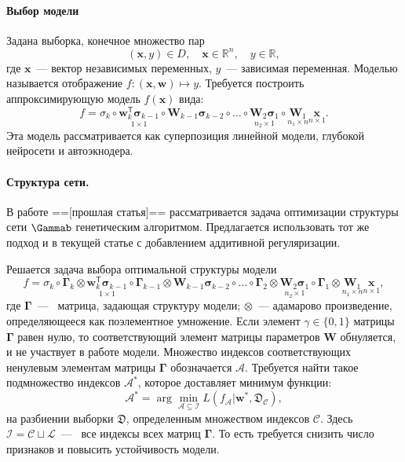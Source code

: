 \documentclass[12pt, twoside]{article}
\newcommand{\xb}{{\mathbf{x}}}
\newcommand{\sigmab}{{\boldsymbol{\sigma}}}
\newcommand{\x}{{\mathbf{x}}}
\newcommand{\w}{{\mathbf{W}}}
\newcommand{\wm}{{\mathbf{w}}}
\begin{document}
\paragraph{Выбор модели}
Задана выборка, конечное множество пар
\begin{equation}\label{eq3}
(\xb,y) \in D,\quad \xb \in \mathbb{R}^{n},\quad y\in \mathbb{R},
\end{equation}
где $\xb$~--- вектор независимых переменных, $y$~--- зависимая переменная. Моделью называется отображение $f:(\xb,\wm)\mapsto y$. Требуется построить аппроксимирующую модель $f(\x)$ вида:
\begin{equation}\label{eq:model}
f = \sigma_k\circ\underset{1\times1}{\wm_k^\mathsf{T}\sigmab_{k-1}}\circ\w_{k-1}\sigmab_{k-2}\circ\dots\circ\underset{n_2 \times 1}{\w_2\sigmab_1}\circ\underset{n_1 \times n}{\w_1}\underset{n \times 1}{\x}.
\end{equation}
Эта модель рассматривается как суперпозиция линейной модели, глубокой нейросети и автоэкнодера.
\\

\paragraph{Структура сети.}
В работе ==[прошлая статья]== рассматривается задача оптимизации структуры сети $\Gammab$ генетическим алгоритмом. Предлагается  использовать тот же подход и в текущей статье с добавлением аддитивной регуляризации. 

Решается задача выбора оптимальной структуры модели
\begin{equation}\label{eq57}
f = \sigma_k\circ\boldsymbol{\Gamma}_k\otimes\underset{1\times1}{\wm_k^\mathsf{T}\sigmab_{k-1}}\circ\boldsymbol{\Gamma}_{k-1}\otimes\w_{k-1}\sigmab_{k-2}\circ\dots\circ\boldsymbol{\Gamma}_2\otimes\underset{n_2 \times 1}{\w_2\sigmab_1}\circ\boldsymbol{\Gamma}_1\otimes\underset{n_1 \times n}{\w_1}\underset{n \times 1}{\x},
\end{equation}
где $\boldsymbol{\Gamma}$~---~ матрица, задающая структуру модели; $\otimes$~--- адамарово произведение, определяющееся как поэлементное умножение. Если элемент $\gamma\in\{0,1\}$ матрицы $\boldsymbol{\Gamma}$ равен нулю, то соответствующий элемент матрицы параметров $\w$ обнуляется, и не участвует в работе модели. Множество индексов соответствующих ненулевым элементам матрицы $\boldsymbol{\Gamma}$ обозначается $\mathcal{A}$.  Требуется найти такое подмножество индексов $\mathcal{A}^{*}$, которое доставляет минимум функции:
\begin{equation}\label{eq46}
\mathcal{A}^{*} = \arg \underset{\mathcal{A} \subseteq \mathcal{I}}\min L(f_{\mathcal{A}}|\wm^*, \mathfrak{D}_\mathcal{C}),
\end{equation}
на разбиении выборки $\mathfrak{D}$, определенным множеством индексов $\mathcal{C}$. Здесь $\mathcal{I} = \mathcal{C}\sqcup \mathcal{L}$~---~ все индексы всех матриц $\boldsymbol{\Gamma}$. То есть требуется снизить число признаков и повысить устойчивость модели.
\end{document}
